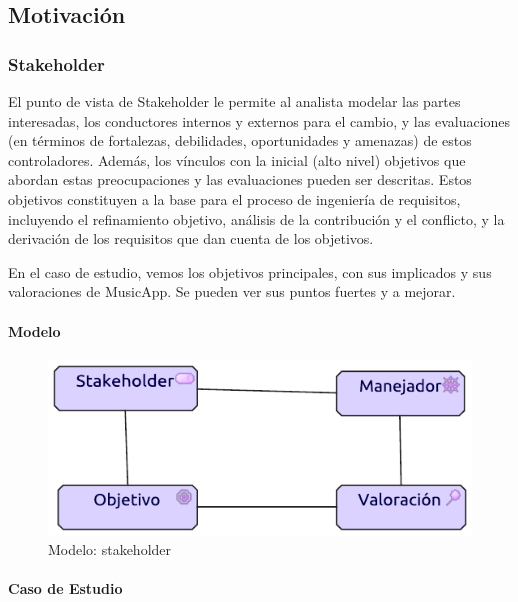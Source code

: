 \subsection{Motivación}
\subsubsection{Stakeholder}
El punto de vista de Stakeholder le permite al analista modelar las partes interesadas, los conductores internos y externos para el cambio, y las evaluaciones (en términos de fortalezas, debilidades, oportunidades y amenazas) de estos controladores. Además, los vínculos con la inicial (alto nivel) objetivos que abordan estas preocupaciones y las evaluaciones pueden ser descritas. Estos objetivos constituyen a la base para el proceso de ingeniería de requisitos, incluyendo el refinamiento objetivo, análisis de la contribución y el conflicto, y la derivación de los requisitos que dan cuenta de los objetivos.  \vspace{\baselineskip}

En el caso de estudio, vemos los objetivos principales, con sus implicados y sus valoraciones de MusicApp. Se pueden ver sus puntos fuertes y a mejorar.

\newpage
\paragraph{Modelo}
\begin{figure}[h!]
	\centering
	\includegraphics[width=0.6\linewidth]{Desarrollo/ArquitecturaEmpresarial/Motivacion/imgs/stakeholderMetamodelo.pdf}
	\caption{Modelo: stakeholder}
\end{figure}
\paragraph{Caso de Estudio}

